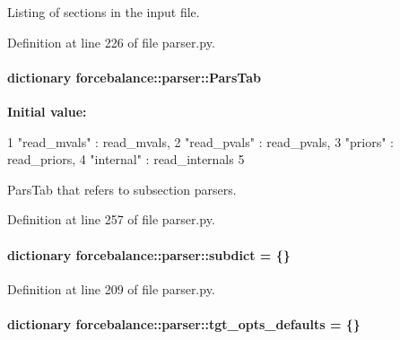 \-Listing of sections in the input file. 



\-Definition at line 226 of file parser.\-py.

\hypertarget{namespaceforcebalance_1_1parser_af0a8dc5cdc54cc88ded3ee3b46d71672}{
\paragraph[{\-Pars\-Tab}]{\setlength{\rightskip}{0pt plus 5cm}dictionary {\bf forcebalance\-::parser\-::\-Pars\-Tab}}}\label{namespaceforcebalance_1_1parser_af0a8dc5cdc54cc88ded3ee3b46d71672}
{\bfseries \-Initial value\-:}
\begin{DoxyCode}
1 {"read_mvals" : read_mvals,
2             "read_pvals" : read_pvals,
3             "priors"     : read_priors,
4             "internal"   : read_internals
5             }
\end{DoxyCode}


\-Pars\-Tab that refers to subsection parsers. 



\-Definition at line 257 of file parser.\-py.

\hypertarget{namespaceforcebalance_1_1parser_abb7a7e9723de629aa97727a85bcdbad1}{
\paragraph[{subdict}]{\setlength{\rightskip}{0pt plus 5cm}dictionary {\bf forcebalance\-::parser\-::subdict} = \{\}}}\label{namespaceforcebalance_1_1parser_abb7a7e9723de629aa97727a85bcdbad1}


\-Definition at line 209 of file parser.\-py.

\hypertarget{namespaceforcebalance_1_1parser_ad2c80e2b742fbd9594fd813dd51550e6}{
\paragraph[{tgt\-\_\-opts\-\_\-defaults}]{\setlength{\rightskip}{0pt plus 5cm}dictionary {\bf forcebalance\-::parser\-::tgt\-\_\-opts\-\_\-defaults} = \{\}}}\label{namespaceforcebalance_1_1parser_ad2c80e2b742fbd9594fd813dd51550e6}


